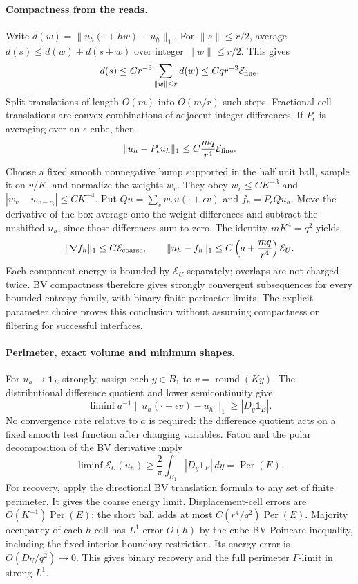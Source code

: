 \paragraph{Compactness from the reads.}
Write $d(w)=\|u_h(\cdot+hw)-u_h\|_1$. For $\|s\|\le r/2$, average
$d(s)\le d(w)+d(s+w)$ over integer $\|w\|\le r/2$. This gives
\[
 d(s)\le Cr^{-3}\sum_{\|w\|\le r}d(w)
       \le Cqr^{-3}\mathcal E_{\rm fine}.
\]
Split translations of length $O(m)$ into $O(m/r)$ such steps. Fractional
cell translations are convex combinations of adjacent integer differences.
If $P_\epsilon$ is averaging over an $\epsilon$-cube, then
\[
 \|u_h-P_\epsilon u_h\|_1
 \le C\frac{mq}{r^4}\mathcal E_{\rm fine}.
\]
Choose a fixed smooth nonnegative bump supported in the half unit ball,
sample it on $v/K$, and normalize the weights $w_v$. They obey
$w_v\le CK^{-3}$ and $|w_v-w_{v-e_i}|\le CK^{-4}$. Put
$Qu=\sum_vw_vu(\cdot+\epsilon v)$ and $f_h=P_\epsilon Qu_h$.
Move the derivative of the box average onto the weight differences and
subtract the unshifted $u_h$, since those differences sum to zero. The
identity $mK^4=q^2$ yields
\[
 \|\nabla f_h\|_1\le C\mathcal E_{\rm coarse},
 \qquad
 \|u_h-f_h\|_1\le C\left(a+\frac{mq}{r^4}\right)\mathcal E_U.
\]
Each component energy is bounded by $\mathcal E_U$ separately; overlaps
are not charged twice. BV compactness therefore gives strongly convergent
subsequences for every bounded-entropy family, with binary finite-perimeter
limits. The explicit parameter choice proves this conclusion without
assuming compactness or filtering for successful interfaces.

\paragraph{Perimeter, exact volume and minimum shapes.}
For $u_h\to\mathbf1_E$ strongly, assign each $y\in B_1$ to
$v=\operatorname{round}(Ky)$. The distributional difference quotient and
lower semicontinuity give
\[
 \liminf a^{-1}\|u_h(\cdot+\epsilon v)-u_h\|_1
 \ge |D_y\mathbf1_E|.
\]
No convergence rate relative to $a$ is required: the difference quotient
acts on a fixed smooth test function after changing variables. Fatou and
the polar decomposition of the BV derivative imply
\[
 \liminf\mathcal E_U(u_h)
 \ge\frac2\pi\int_{B_1}|D_y\mathbf1_E|\,dy
 =\operatorname{Per}(E).
\]
For recovery, apply the directional BV translation formula to any set of
finite perimeter. It gives the coarse energy limit. Displacement-cell errors are
$O(K^{-1})\operatorname{Per}(E)$; the short ball adds at most
$C(r^4/q^2)\operatorname{Per}(E)$. Majority occupancy of each $h$-cell
has $L^1$ error $O(h)$ by the cube BV Poincare inequality, including the
fixed interior boundary restriction. Its energy error is
$O(D_U/q^2)\to0$. This gives binary recovery and the full perimeter
$\Gamma$-limit in strong $L^1$.

